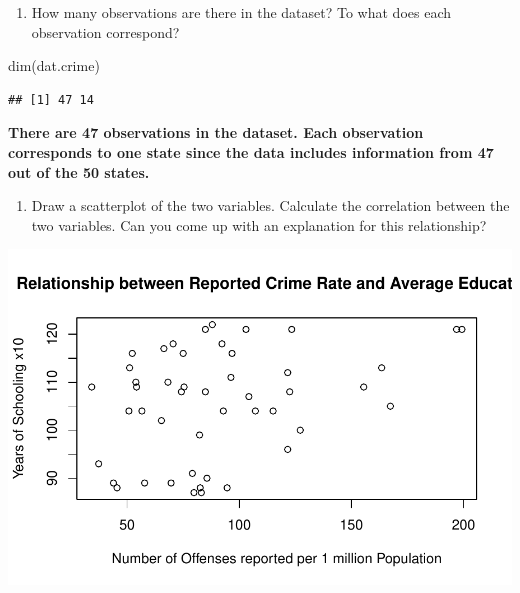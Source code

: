 \documentclass[
]{article}
\newenvironment{Shaded}{\begin{snugshade}}{\end{snugshade}}
\newcommand{\AttributeTok}[1]{\textcolor[rgb]{0.77,0.63,0.00}{#1}}
\newcommand{\FunctionTok}[1]{\textcolor[rgb]{0.00,0.00,0.00}{#1}}
\newcommand{\NormalTok}[1]{#1}
\newcommand{\SpecialCharTok}[1]{\textcolor[rgb]{0.00,0.00,0.00}{#1}}
\newcommand{\StringTok}[1]{\textcolor[rgb]{0.31,0.60,0.02}{#1}}
\providecommand{\tightlist}{%
  \setlength{\itemsep}{0pt}\setlength{\parskip}{0pt}}
\begin{document}
\begin{enumerate}
\def\labelenumi{\arabic{enumi}.}
\tightlist
\item
  How many observations are there in the dataset? To what does each
  observation correspond?
\end{enumerate}

\begin{Shaded}
\begin{Highlighting}[]
\FunctionTok{dim}\NormalTok{(dat.crime)}
\end{Highlighting}
\end{Shaded}

\begin{verbatim}
## [1] 47 14
\end{verbatim}

\textbf{There are 47 observations in the dataset. Each observation
corresponds to one state since the data includes information from 47 out
of the 50 states. }

\begin{enumerate}
\def\labelenumi{\arabic{enumi}.}
\setcounter{enumi}{1}
\tightlist
\item
  Draw a scatterplot of the two variables. Calculate the correlation
  between the two variables. Can you come up with an explanation for
  this relationship?
\end{enumerate}

\begin{Shaded}
\end{Shaded}

\includegraphics{Assignments_files/figure-latex/unnamed-chunk-31-1.pdf}
\end{document}
